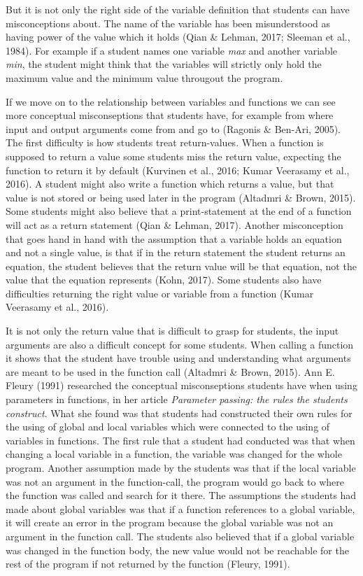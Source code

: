 \documentclass[twocolumn]{article}
\begin{document}
But it is not only the right side of the variable definition that students can have misconceptions about. The name of the variable has been misunderstood as having power of the value which it holds (Qian \& Lehman, 2017; Sleeman et al., 1984). For example if a student names one variable \emph{max} and another variable \emph{min}, the student might think that the variables will strictly only hold the maximum value and the minimum value througout the program. 

If we move on to the relationship between variables and functions we can see more conceptual misconseptions that students have, for example from where input and output arguments come from and go to (Ragonis \& Ben-Ari, 2005). The first difficulty is how students treat return-values. When a function is supposed to return a value some students miss the return value, expecting the function to return it by default (Kurvinen et al., 2016; Kumar Veerasamy et al., 2016). A student might also write a function which returns a value, but that value is not stored or being used later in the program (Altadmri \& Brown, 2015). Some students might also believe that a print-statement at the end of a function will act as a return statement (Qian \& Lehman, 2017). Another misconception that goes hand in hand with the assumption that a variable holds an equation and not a single value, is that if in the return statement the student returns an equation, the student believes that the return value will be that equation, not the value that the equation represents (Kohn, 2017). Some students also have difficulties returning the right value or variable from a function (Kumar Veerasamy et al., 2016). 

It is not only the return value that is difficult to grasp for students, the input arguments are also a difficult concept for some students. When calling a function it shows that the student have trouble using and understanding what arguments are meant to be used in the function call (Altadmri \& Brown, 2015). Ann E. Fleury (1991) researched the conceptual misconseptions students have when using parameters in functions, in her article \emph{Parameter passing: the rules the students construct}. What she found was that students had constructed their own rules for the using of global and local variables which were connected to the using of variables in functions. The first rule that a student had conducted was that when changing a local variable in a function, the variable was changed for the whole program. Another assumption made by the students was that if the local variable was not an argument in the function-call, the program would go back to where the function was called and search for it there. The assumptions the students had made about global variables was that if a function references to a global variable, it will create an error in the program because the global variable was not an argument in the function call. The students also believed that if a global variable was changed in the function body, the new value would not be reachable for the rest of the program if not returned by the function (Fleury, 1991).
\end{document}
